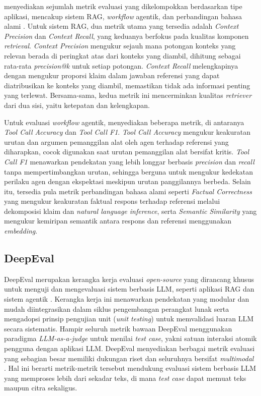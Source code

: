 \textcite{ragas2024} menyediakan sejumlah metrik evaluasi yang dikelompokkan berdasarkan tipe aplikasi, mencakup sistem RAG, \textit{workflow} agentik, dan perbandingan bahasa alami \parencite{ragas2024}. Untuk sistem RAG, dua metrik utama yang tersedia adalah \textit{Context Precision} dan \textit{Context Recall}, yang keduanya berfokus pada kualitas komponen \textit{retrieval}. \textit{Context Precision} mengukur sejauh mana potongan konteks yang relevan berada di peringkat atas dari konteks yang diambil, dihitung sebagai rata-rata \textit{precision@k} untuk setiap potongan. \textit{Context Recall} melengkapinya dengan mengukur proporsi klaim dalam jawaban referensi yang dapat diatribusikan ke konteks yang diambil, memastikan tidak ada informasi penting yang terlewat. Bersama-sama, kedua metrik ini mencerminkan kualitas \textit{retriever} dari dua sisi, yaitu ketepatan dan kelengkapan.

Untuk evaluasi \textit{workflow} agentik, \textcite{ragas2024} menyediakan beberapa metrik, di antaranya \textit{Tool Call Accuracy} dan \textit{Tool Call F1}. \textit{Tool Call Accuracy} mengukur keakuratan urutan dan argumen pemanggilan alat oleh agen terhadap referensi yang diharapkan, cocok digunakan saat urutan pemanggilan alat bersifat kritis. \textit{Tool Call F1} menawarkan pendekatan yang lebih longgar berbasis \textit{precision} dan \textit{recall} tanpa mempertimbangkan urutan, sehingga berguna untuk mengukur kedekatan perilaku agen dengan ekspektasi meskipun urutan panggilannya berbeda. Selain itu, tersedia pula metrik perbandingan bahasa alami seperti \textit{Factual Correctness} yang mengukur keakuratan faktual respons terhadap referensi melalui dekomposisi klaim dan \textit{natural language inference}, serta \textit{Semantic Similarity} yang mengukur kemiripan semantik antara respons dan referensi menggunakan \textit{embedding}.

\subsection{DeepEval}
DeepEval merupakan kerangka kerja evaluasi \textit{open-source} yang dirancang khusus untuk menguji dan mengevaluasi sistem berbasis LLM, seperti aplikasi RAG dan sistem agentik \parencite{confidentaiDeepEval2025}. Kerangka kerja ini menawarkan pendekatan yang modular dan mudah diintegrasikan dalam siklus pengembangan perangkat lunak serta mengadopsi prinsip pengujian unit (\textit{unit testing}) untuk memvalidasi luaran LLM secara sistematis. Hampir seluruh metrik bawaan DeepEval menggunakan paradigma \textit{LLM-as-a-judge} untuk menilai \textit{test case}, yakni satuan interaksi atomik pengguna dengan aplikasi LLM. DeepEval menyediakan berbagai metrik evaluasi yang sebagian besar memiliki dukungan riset dan seluruhnya bersifat \textit{multimodal} \parencite{confidentaiDeepEval2025}. Hal ini berarti metrik-metrik tersebut mendukung evaluasi sistem berbasis LLM yang memproses lebih dari sekadar teks, di mana \textit{test case} dapat memuat teks maupun citra sekaligus.


